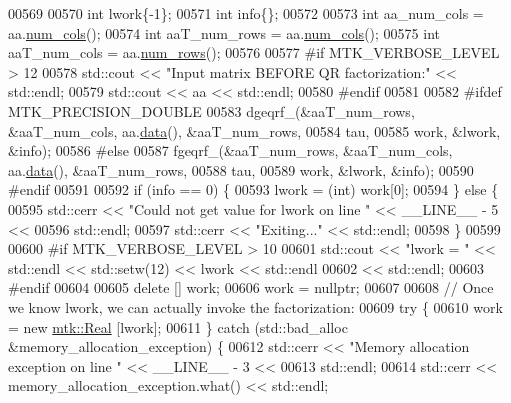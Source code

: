 \begin{DoxyCode}
00569 
00570   \textcolor{keywordtype}{int} lwork\{-1\};
00571   \textcolor{keywordtype}{int} info\{\};
00572 
00573   \textcolor{keywordtype}{int} aa\_num\_cols = aa.\hyperlink{classmtk_1_1DenseMatrix_a41747502d468c6728a4be31501b16e0e}{num\_cols}();
00574   \textcolor{keywordtype}{int} aaT\_num\_rows = aa.\hyperlink{classmtk_1_1DenseMatrix_a41747502d468c6728a4be31501b16e0e}{num\_cols}();
00575   \textcolor{keywordtype}{int} aaT\_num\_cols = aa.\hyperlink{classmtk_1_1DenseMatrix_a53f3afb3b6a8d21854458aaa9663cc74}{num\_rows}();
00576 
00577 \textcolor{preprocessor}{  #if MTK\_VERBOSE\_LEVEL > 12}
00578   std::cout << \textcolor{stringliteral}{"Input matrix BEFORE QR factorization:"} << std::endl;
00579   std::cout << aa << std::endl;
00580 \textcolor{preprocessor}{  #endif}
00581 
00582 \textcolor{preprocessor}{  #ifdef MTK\_PRECISION\_DOUBLE}
00583   dgeqrf\_(&aaT\_num\_rows, &aaT\_num\_cols, aa.\hyperlink{classmtk_1_1DenseMatrix_a0c33b8a9e01d157c61ddbdf807c25d84}{data}(), &aaT\_num\_rows,
00584           tau,
00585           work, &lwork, &info);
00586 \textcolor{preprocessor}{  #else}
00587   fgeqrf\_(&aaT\_num\_rows, &aaT\_num\_cols, aa.\hyperlink{classmtk_1_1DenseMatrix_a0c33b8a9e01d157c61ddbdf807c25d84}{data}(), &aaT\_num\_rows,
00588           tau,
00589           work, &lwork, &info);
00590 \textcolor{preprocessor}{  #endif}
00591 
00592   \textcolor{keywordflow}{if} (info == 0) \{
00593     lwork = (int) work[0];
00594   \} \textcolor{keywordflow}{else} \{
00595     std::cerr << \textcolor{stringliteral}{"Could not get value for lwork on line "} << \_\_LINE\_\_ - 5 <<
00596       std::endl;
00597     std::cerr << \textcolor{stringliteral}{"Exiting..."} << std::endl;
00598   \}
00599 
00600 \textcolor{preprocessor}{  #if MTK\_VERBOSE\_LEVEL > 10}
00601   std::cout << \textcolor{stringliteral}{"lwork = "} << std::endl << std::setw(12) << lwork << std::endl
00602     << std::endl;
00603 \textcolor{preprocessor}{  #endif}
00604 
00605   \textcolor{keyword}{delete} [] work;
00606   work = \textcolor{keyword}{nullptr};
00607 
00608   \textcolor{comment}{// Once we know lwork, we can actually invoke the factorization:}
00609   \textcolor{keywordflow}{try} \{
00610     work = \textcolor{keyword}{new} \hyperlink{group__c01-roots_gac080bbbf5cbb5502c9f00405f894857d}{mtk::Real} [lwork];
00611   \} \textcolor{keywordflow}{catch} (std::bad\_alloc &memory\_allocation\_exception) \{
00612     std::cerr << \textcolor{stringliteral}{"Memory allocation exception on line "} << \_\_LINE\_\_ - 3 <<
00613       std::endl;
00614     std::cerr << memory\_allocation\_exception.what() << std::endl;

\end{DoxyCode}
